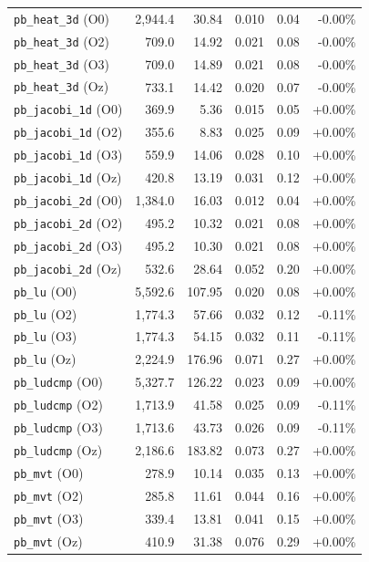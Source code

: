 {\begin{longtable}{lrrrrr}
\texttt{pb\_heat\_3d} (O0) & 2,944.4 & 30.84 & 0.010 & 0.04 & -0.00\% \\
\texttt{pb\_heat\_3d} (O2) & 709.0 & 14.92 & 0.021 & 0.08 & -0.00\% \\
\texttt{pb\_heat\_3d} (O3) & 709.0 & 14.89 & 0.021 & 0.08 & -0.00\% \\
\texttt{pb\_heat\_3d} (Oz) & 733.1 & 14.42 & 0.020 & 0.07 & -0.00\% \\
\texttt{pb\_jacobi\_1d} (O0) & 369.9 & 5.36 & 0.015 & 0.05 & +0.00\% \\
\texttt{pb\_jacobi\_1d} (O2) & 355.6 & 8.83 & 0.025 & 0.09 & +0.00\% \\
\texttt{pb\_jacobi\_1d} (O3) & 559.9 & 14.06 & 0.028 & 0.10 & +0.00\% \\
\texttt{pb\_jacobi\_1d} (Oz) & 420.8 & 13.19 & 0.031 & 0.12 & +0.00\% \\
\texttt{pb\_jacobi\_2d} (O0) & 1,384.0 & 16.03 & 0.012 & 0.04 & +0.00\% \\
\texttt{pb\_jacobi\_2d} (O2) & 495.2 & 10.32 & 0.021 & 0.08 & +0.00\% \\
\texttt{pb\_jacobi\_2d} (O3) & 495.2 & 10.30 & 0.021 & 0.08 & +0.00\% \\
\texttt{pb\_jacobi\_2d} (Oz) & 532.6 & 28.64 & 0.052 & 0.20 & +0.00\% \\
\texttt{pb\_lu} (O0) & 5,592.6 & 107.95 & 0.020 & 0.08 & +0.00\% \\
\texttt{pb\_lu} (O2) & 1,774.3 & 57.66 & 0.032 & 0.12 & -0.11\% \\
\texttt{pb\_lu} (O3) & 1,774.3 & 54.15 & 0.032 & 0.11 & -0.11\% \\
\texttt{pb\_lu} (Oz) & 2,224.9 & 176.96 & 0.071 & 0.27 & +0.00\% \\
\texttt{pb\_ludcmp} (O0) & 5,327.7 & 126.22 & 0.023 & 0.09 & +0.00\% \\
\texttt{pb\_ludcmp} (O2) & 1,713.9 & 41.58 & 0.025 & 0.09 & -0.11\% \\
\texttt{pb\_ludcmp} (O3) & 1,713.6 & 43.73 & 0.026 & 0.09 & -0.11\% \\
\texttt{pb\_ludcmp} (Oz) & 2,186.6 & 183.82 & 0.073 & 0.27 & +0.00\% \\
\texttt{pb\_mvt} (O0) & 278.9 & 10.14 & 0.035 & 0.13 & +0.00\% \\
\texttt{pb\_mvt} (O2) & 285.8 & 11.61 & 0.044 & 0.16 & +0.00\% \\
\texttt{pb\_mvt} (O3) & 339.4 & 13.81 & 0.041 & 0.15 & +0.00\% \\
\texttt{pb\_mvt} (Oz) & 410.9 & 31.38 & 0.076 & 0.29 & +0.00\% \\

\end{longtable}}
